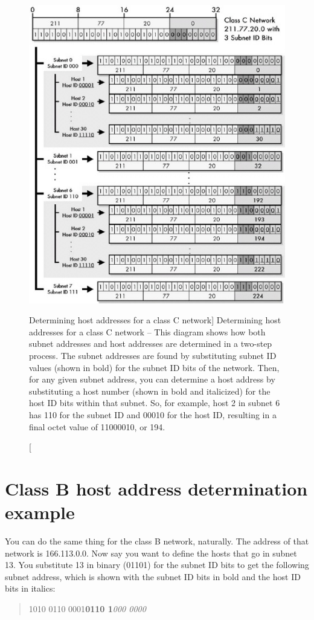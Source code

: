 \begin{figure}
   \centering
   \includegraphics{images/class-c-host-addresses.jpg}
   \caption
      [Determining host addresses for a class C network]
      {Determining host addresses for a class C network --
      This diagram shows how both subnet addresses and host addresses are determined in a two-step process.
      The subnet addresses are found by substituting subnet ID values (shown in bold) for the subnet ID bits of the network.
      Then, for any given subnet address, you can determine a host address by substituting a host number (shown in bold and italicized)
      for the host ID bits within that subnet.
      So, for example, host 2 in subnet 6 has 110 for the subnet ID and 00010 for the host ID, resulting in a final octet value of 11000010, or 194.}
   \label{fig:class-c-host-addresses}
\end{figure}


\section{Class B host address determination example}

You can do the same thing for the class B network, naturally.
The address of that network is 166.113.0.0.
Now say you want to define the hosts that go in subnet 13.
You substitute 13 in binary (01101) for the subnet ID bits to get the following subnet address,
which is shown with the subnet ID bits in bold and the host ID bits in italics:
\begin{quote}
1010 0110 0001\quad \textbf{0110 1}\textit{000 0000}
\end{quote}

